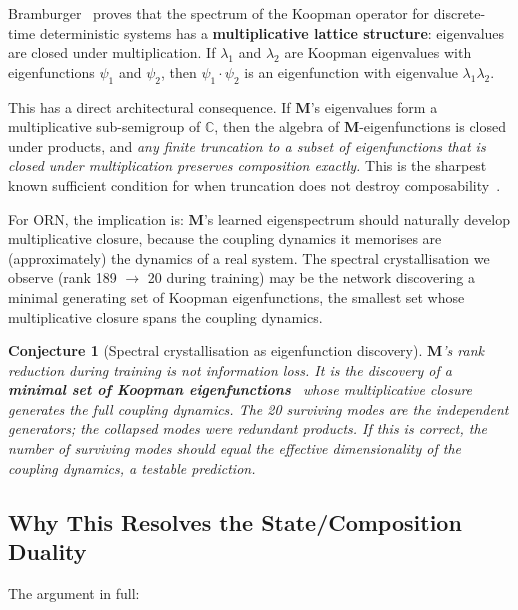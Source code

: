 \documentclass[11pt, a4paper]{article}
\newcommand{\M}{\mathbf{M}}
\theoremstyle{plain}
\newtheorem{conjecture}{Conjecture}
\theoremstyle{remark}
\begin{document}
Bramburger~\cite{bramburger2025lattice} proves that the spectrum of the Koopman operator for discrete-time deterministic systems has a \textbf{multiplicative lattice structure}: eigenvalues are closed under multiplication.
If $\lambda_1$ and $\lambda_2$ are Koopman eigenvalues with eigenfunctions $\psi_1$ and $\psi_2$, then $\psi_1 \cdot \psi_2$ is an eigenfunction with eigenvalue $\lambda_1 \lambda_2$.

This has a direct architectural consequence.
If $\M$'s eigenvalues form a multiplicative sub-semigroup of $\mathbb{C}$, then the algebra of $\M$-eigenfunctions is closed under products, and \emph{any finite truncation to a subset of eigenfunctions that is closed under multiplication preserves composition exactly.}
This is the sharpest known sufficient condition for when truncation does not destroy composability~\cite{brunton2016koopman, kvalheim2021minimal}.

For ORN, the implication is: $\M$'s learned eigenspectrum should naturally develop multiplicative closure, because the coupling dynamics it memorises are (approximately) the dynamics of a real system.
The spectral crystallisation we observe (rank 189 $\to$ 20 during training) may be the network discovering a minimal generating set of Koopman eigenfunctions, the smallest set whose multiplicative closure spans the coupling dynamics.

\begin{conjecture}[Spectral crystallisation as eigenfunction discovery]
$\M$'s rank reduction during training is not information loss.
It is the discovery of a \textbf{minimal set of Koopman eigenfunctions}~\cite{kvalheim2021minimal} whose multiplicative closure generates the full coupling dynamics.
The 20 surviving modes are the independent generators; the collapsed modes were redundant products.
If this is correct, the number of surviving modes should equal the effective dimensionality of the coupling dynamics, a testable prediction.
\end{conjecture}

\subsection{Why This Resolves the State/Composition Duality}

The argument in full:
\end{document}
